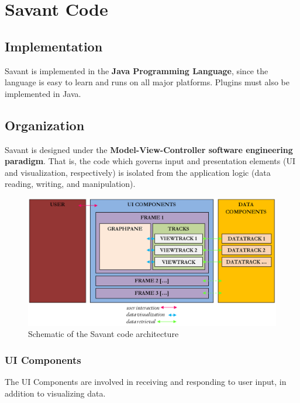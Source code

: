 \documentclass{report}
\begin{document}
\chapter{Savant Code}

\section{Implementation}

Savant is implemented in the {\bf Java Programming Language}, since the language is easy to learn and runs on all major platforms. Plugins must also be implemented in Java.

\section{Organization}

Savant is designed under the {\bf Model-View-Controller software engineering paradigm}. That is, the code which governs input and presentation elements (UI and visualization, respectively) is isolated from the application logic (data reading, writing, and manipulation).

\begin{figure}[!h]
\begin{center}
\includegraphics[type=png,ext=.png,read=.png,width=16cm]{images/arch}
\caption{Schematic of the Savant code architecture}
\label{}
\end{center}
\end{figure}

\subsection{UI Components}

The UI Components are involved in receiving and responding to user input, in addition to visualizing data.
\end{document}

